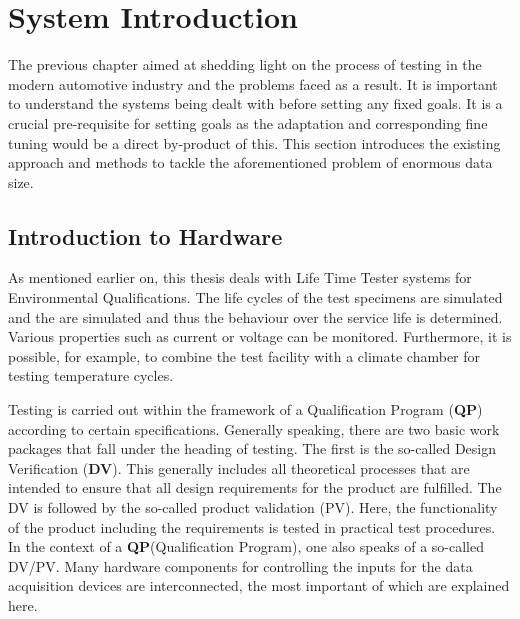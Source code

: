 \section{System Introduction}\label{sec:RelatedWork}

The previous chapter aimed at shedding light on the process of testing in the modern automotive industry and the problems faced as a result. It is important to understand the systems being dealt with before setting any fixed goals. It is a crucial pre-requisite for setting goals as the adaptation and corresponding fine tuning would be a direct by-product of this. This section introduces the existing approach and methods to tackle the aforementioned problem of enormous data size. 

\subsection{Introduction to Hardware} \label{sec:hardware}
 As mentioned earlier on, this thesis deals with Life Time Tester systems for Environmental Qualifications. The life cycles of the test specimens are simulated and the are simulated and thus the behaviour over the service life is determined. Various properties such as current or voltage can be monitored. Furthermore, it is possible, for example, to combine the test facility with a climate chamber for testing temperature cycles. 

Testing is carried out within the framework of a Qualification Program (\textbf{QP}) according to certain specifications. Generally speaking, there are two basic work packages that fall under the heading of testing. The first is the so-called Design Verification (\textbf{DV}). This generally includes all theoretical processes that are intended to ensure that all design requirements for the product are fulfilled. The DV is followed by the so-called product validation (PV). Here, the functionality of the product including the requirements is tested in practical test procedures. In the context of a \textbf{QP}(Qualification Program), one also speaks of a so-called DV/PV. Many hardware components for controlling the inputs for the data acquisition devices are interconnected, the most important of which are explained here. 

